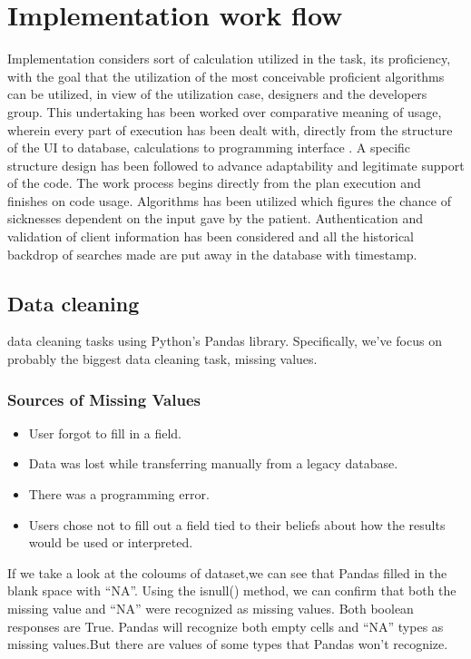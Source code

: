 \documentclass[oneside,12pt]{Classes/VTU}
\begin{document}
	\section{Implementation work flow}
	Implementation considers sort of calculation utilized in the task, its proficiency, with the goal that the utilization of the most conceivable proficient algorithms can be utilized, in view of the utilization case, designers and the developers group. This undertaking has been worked over comparative meaning of usage, wherein every part of execution has been dealt with, directly from the structure of the UI to database, calculations to programming interface . A specific structure design has been followed to advance adaptability and legitimate support of the code. The work process begins directly from the plan execution and finishes on code usage. Algorithms has been utilized which figures the chance of sicknesses dependent on the input gave by the patient. Authentication and validation of client information has been considered and all the historical backdrop of searches made are put away in the database with timestamp.
	\subsection{Data cleaning}
	data cleaning tasks using Python’s Pandas library. Specifically, we’ve focus on probably the biggest data cleaning task, missing values.
	\subsubsection{Sources of Missing Values}
	\begin{itemize}
		\item User forgot to fill in a field.
		\item Data was lost while transferring manually from a legacy database.
		\item There was a programming error.
		\item Users chose not to fill out a field tied to their beliefs about how the results would be used or interpreted. 
	\end{itemize}
	If we take a look at the coloums of dataset,we can see that Pandas filled in the blank space with “NA”. Using the isnull() method, we can confirm that both the missing value and “NA” were recognized as missing values. Both boolean responses are True. Pandas will recognize both empty cells and “NA” types as missing values.But there are values of some types that Pandas won’t recognize.
\end{document}
